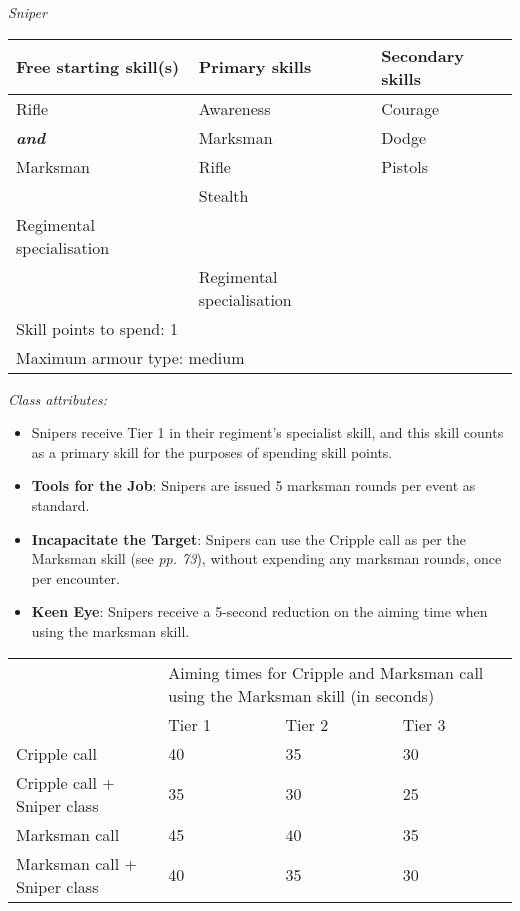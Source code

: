 \documentclass{scrbook}
\begin{document}
\textit{Sniper}

\begin{table}
\begin{tabular}{|l|l|l|} \hline 
Free starting skill(s) & Primary skills & Secondary skills \\
 \hline Rifle & Awareness & Courage \\
 \hline \textbf{\textit{and}} & Marksman & Dodge \\
 \hline Marksman & Rifle & Pistols \\
 \hline  & Stealth &  \\
 \hline Regimental specialisation &  &  \\
 \hline  & Regimental specialisation &  \\
 \hline \multicolumn{3}{|l|}{Skill points to spend: 1} \\
 \hline \multicolumn{3}{|l|}{Maximum armour type: medium} \\
 \hline \end{tabular}

\end{table}

\textit{Class attributes:}

\begin{itemize}
\item Snipers receive Tier 1 in their regiment's specialist skill, and this skill counts as a primary skill for the purposes of spending skill points.

\item \textbf{Tools for the Job}: Snipers are issued 5 marksman rounds per event as standard.

\item \textbf{Incapacitate the Target}: Snipers can use the Cripple call as per the Marksman skill (see \textit{pp. 73}), without expending any marksman rounds, once per encounter.

\item \textbf{Keen Eye}: Snipers receive a 5-second reduction on the aiming time when using the marksman skill.

\end{itemize}

\begin{table}
\begin{tabular}{|l|l|l|l|} \hline 
\multirow{1}{*}{}& \multicolumn{3}{|l|}{Aiming times for Cripple and Marksman call using the Marksman skill (in seconds)} \\
\cline{2-2}\cline{3-3}\cline{4-4} & Tier 1 & Tier 2 & Tier 3 \\
 \hline Cripple call & 40 & 35 & 30 \\
 \hline Cripple call + Sniper class & 35 & 30 & 25 \\
 \hline Marksman call & 45 & 40 & 35 \\
 \hline Marksman call + Sniper class & 40 & 35 & 30 \\
 \hline \end{tabular}

\end{table}
\end{document}
